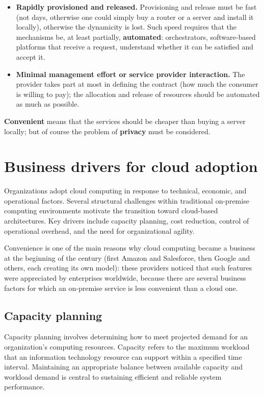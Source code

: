 \documentclass[11pt,a4paper,openany]{report}
\begin{document}
\begin{itemize}
	\item \textbf{Rapidly provisioned and released.} Provisioning and release must be fast (not days, otherwise one could simply buy a router or a server and install it locally), otherwise the dynamicity is lost. Such speed requires that the mechanisms be, at least partially, \textbf{automated}: orchestrators, software-based platforms that receive a request, understand whether it can be satisfied and accept it.
	\item \textbf{Minimal management effort or service provider interaction.} The provider takes part at most in defining the contract (how much the consumer is willing to pay); the allocation and release of resources should be automated as much as possible.
\end{itemize}

\begin{notebox}
	\textbf{Convenient} means that the services should be cheaper than buying a server locally; but of course the problem of \textbf{privacy} must be considered.
\end{notebox}

\section{Business drivers for cloud adoption}

Organizations adopt cloud computing in response to technical, economic, and operational factors. Several structural challenges within traditional on-premise computing environments motivate the transition toward cloud-based architectures. Key drivers include capacity planning, cost reduction, control of operational overhead, and the need for organizational agility.

Convenience is one of the main reasons why cloud computing became a business at the beginning of the century (first Amazon and Salesforce, then Google and others, each creating its own model): these providers noticed that such features were appreciated by enterprises worldwide, because there are several business factors for which an on-premise service is less convenient than a cloud one.

\subsection{Capacity planning}

Capacity planning involves determining how to meet projected demand for an organization's computing resources. Capacity refers to the maximum workload that an information technology resource can support within a specified time interval. Maintaining an appropriate balance between available capacity and workload demand is central to sustaining efficient and reliable system performance.
\end{document}
